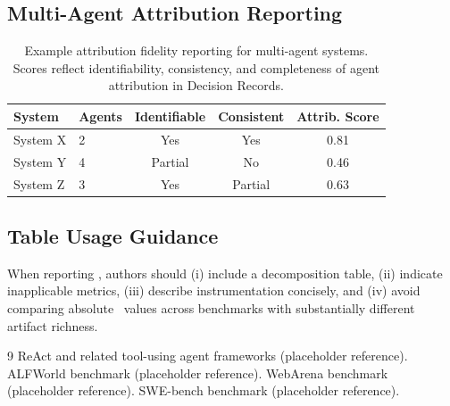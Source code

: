 \subsection{Multi-Agent Attribution Reporting}

\begin{table}[t]
\centering
\begin{tabular}{l l c c c}
\toprule
System & Agents & Identifiable & Consistent & Attrib. Score \\
\midrule
System X & 2 & Yes & Yes & 0.81 \\
System Y & 4 & Partial & No & 0.46 \\
System Z & 3 & Yes & Partial & 0.63 \\
\bottomrule
\end{tabular}
\caption{Example attribution fidelity reporting for multi-agent systems. Scores reflect identifiability, consistency, and completeness of agent attribution in Decision Records.}
\label{tab:attribution}
\end{table}

\subsection{Table Usage Guidance}
When reporting \RSS, authors should (i) include a decomposition table, (ii) indicate inapplicable metrics, (iii) describe instrumentation concisely, and (iv) avoid comparing absolute \RSS\ values across benchmarks with substantially different artifact richness.

\begin{thebibliography}{9}
ReAct and related tool-using agent frameworks (placeholder reference).
ALFWorld benchmark (placeholder reference).
WebArena benchmark (placeholder reference).
SWE-bench benchmark (placeholder reference).
\end{thebibliography}


